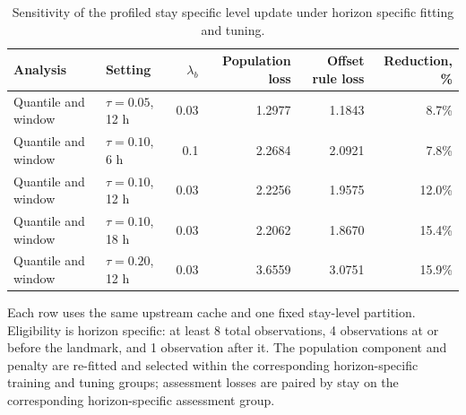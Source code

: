 \begin{table}[!htbp]
\caption{Sensitivity of the profiled stay specific level update under horizon specific fitting and tuning.}
\label{tab:robustness_summary}
\centering
\small
\setlength{\tabcolsep}{5pt}
\begin{tabular}{llrrrr}
\toprule
Analysis & Setting & $\lambda_b$ & Population loss & Offset rule loss & Reduction, \%\\
\midrule
Quantile and window & $\tau=0.05$, 12 h & 0.03 & 1.2977 & 1.1843 & 8.7\%\\
Quantile and window & $\tau=0.10$, 6 h & 0.1 & 2.2684 & 2.0921 & 7.8\%\\
Quantile and window & $\tau=0.10$, 12 h & 0.03 & 2.2256 & 1.9575 & 12.0\%\\
Quantile and window & $\tau=0.10$, 18 h & 0.03 & 2.2062 & 1.8670 & 15.4\%\\
Quantile and window & $\tau=0.20$, 12 h & 0.03 & 3.6559 & 3.0751 & 15.9\%\\
\bottomrule
\end{tabular}
\par\smallskip
\footnotesize{Each row uses the same upstream cache and one fixed stay-level partition. Eligibility is horizon specific: at least 8 total observations, 4 observations at or before the landmark, and 1 observation after it. The population component and penalty are re-fitted and selected within the corresponding horizon-specific training and tuning groups; assessment losses are paired by stay on the corresponding horizon-specific assessment group.}
\end{table}
